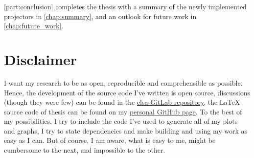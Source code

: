 \autoref{part:conclusion} completes the thesis with a summary of the newly implemented projectors in
\autoref{chap:summary}, and an outlook for future work in \autoref{chap:future_work}.

\section{Disclaimer}\label{sec:disclaimer}

I want my research to be as open, reproducible and comprehensible as possible. Hence, the
development of the source code I've written is open source, discussions (though they were few) can be
found in the \href{https://gitlab.lrz.de/IP/elsa}{elsa GitLab repository}, the \LaTeX{} source code
of thesis can be found on my
\href{https://github.com/ner0-m/ma-thesis-differential-basis-for-ct}{personal GitHub page}. To the
best of my possibilities, I try to include the code I've used to generate all of my plots and
graphs, I try to state dependencies and make building and using my work as easy as I can. But of
course, I am aware, what is easy to me, might be cumbersome to the next, and impossible to the
other.

